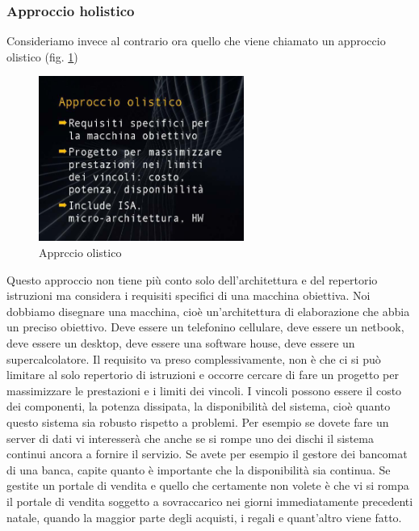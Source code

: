 \subsubsection{Approccio holistico}

Consideriamo invece al contrario ora quello che viene chiamato un approccio olistico (fig. \ref{fig:Lez02_p04_fig_03})

\FloatBarrier
\begin{figure}[H]
  \centering
  \includegraphics[width=0.6\textwidth,
                    trim=40 40 15 40, %
                    clip]{images/Lez02_p04_fig_03.png}
  \caption{Apprccio olistico}
  \label{fig:Lez02_p04_fig_03}
\end{figure}
\FloatBarrier
\noindent

Questo approccio non tiene più conto solo dell'architettura e del repertorio istruzioni ma considera i requisiti specifici di una macchina obiettiva. Noi dobbiamo disegnare una macchina, cioè un'architettura di elaborazione che abbia un preciso obiettivo. Deve essere un telefonino cellulare, deve essere un netbook, deve essere un desktop, deve essere una software house, deve essere un supercalcolatore.
Il requisito va preso complessivamente, non è che ci si può limitare al solo repertorio di istruzioni e occorre cercare di fare un progetto per massimizzare le prestazioni e i limiti dei vincoli.
I vincoli possono essere il costo dei componenti, la potenza dissipata, la disponibilità del sistema, cioè quanto questo sistema sia robusto rispetto a problemi.
Per esempio se dovete fare un server di dati vi interesserà che anche se si rompe uno dei dischi il sistema continui ancora a fornire il servizio.
Se avete per esempio il gestore dei bancomat di una banca, capite quanto è importante che la disponibilità sia continua.
Se gestite un portale di vendita e quello che certamente non volete è che vi si rompa il portale di vendita soggetto a sovraccarico nei giorni immediatamente precedenti natale, quando la maggior parte degli acquisti, i regali e quant'altro viene fatto.

